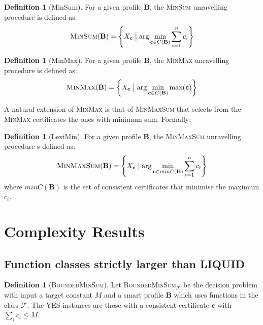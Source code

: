 \documentclass[11pt,a4paper, titlepage]{article}
\theoremstyle{definition}
\newtheorem{definition}[theorem]{Definition}
\let\vec\mathbf
\begin{document}
\begin{definition}[MinSum]
    For a given profile $\mathbf{B}$, the \textsc{MinSum} unravelling procedure is defined as:
    \[
        \textsc{MinSum}(\mathbf{B}) = 
        \left\{X_{\mathbf{c}} \bigm| \mathrm{arg} \min_{\mathbf{c} \in C(\mathbf{B})} \sum_{i=1}^n c_i\right\}
    \]
\end{definition}

\begin{definition}[MinMax]
    For a given profile $\mathbf{B}$, the \textsc{MinMax} unravelling procedure is defined as:
    \[
        \textsc{MinMax}(\mathbf{B}) = \left\{X_{\mathbf{c}} \bigm| \mathrm{arg} \min_{\mathbf{c} \in C(\mathbf{B})} \max (\mathbf{c}) \right\}
    \]
\end{definition}

A natural extension of \textsc{MinMax} is that of \textsc{MinMaxSum} that selects from the \textsc{MinMax} certificates the ones with minimum sum. Formally:

\begin{definition}[LexiMin]
    For a given profile $\mathbf{B}$, the \textsc{MinMaxSum} unravelling procedure s defined as:
    \[
        \textsc{MinMaxSum}(\mathbf{B}) =  \left\{ X_{\mathbf{c}}\mid \arg  \min_{\vec{c} \in \mathit{minC}(\mathbf{B})} \sum_{i=1}^n c_i \right\}
    \]
    where $\mathit{minC}(\vec{B})$ is the set of consistent certificates that minimise the maximum $c_i$. 
\end{definition}


\newpage



\section{Complexity Results}

\subsection{Function classes strictly larger than LIQUID}

\begin{definition}[\textsc{BoundedMinSum}]
    Let \textsc{BoundedMinSum}$_\mathcal{F}$ be the decision problem with input a target constant $M$ and a smart profile $\mathbf{B}$ which uses functions in the class $\mathcal{F}$. The YES instances are those with a consistent certificate  $\vec{c}$ with $\sum_i c_i \leq M$. 
\end{definition}
\end{document}
